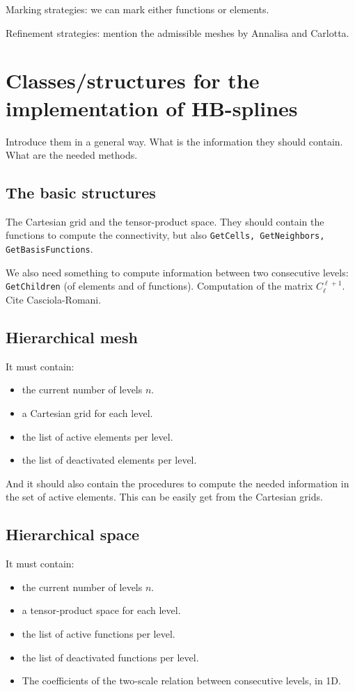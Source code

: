 \documentclass[a4paper]{siamltex1213}
\begin{document}
Marking strategies: we can mark either functions or elements.

Refinement strategies: mention the admissible meshes by Annalisa and Carlotta.


\section{Classes/structures for the implementation of HB-splines}
Introduce them in a general way. What is the information they should contain. What are the needed methods.

\subsection{The basic structures}
The Cartesian grid and the tensor-product space. They should contain the functions to compute the connectivity, but also \texttt{GetCells, GetNeighbors, GetBasisFunctions}. 

We also need something to compute information between two consecutive levels: \texttt{GetChildren} (of elements and of functions). Computation of the matrix $C_\ell^{\ell+1}$. Cite Casciola-Romani.
\subsection{Hierarchical mesh}
It must contain: 
\begin{itemize}
\item the current number of levels $n$.
\item a Cartesian grid for each level. 
\item the list of active elements per level.
\item the list of deactivated elements per level.
\end{itemize}
And it should also contain the procedures to compute the needed information in the set of active elements. This can be easily get from the Cartesian grids.

\subsection{Hierarchical space}
It must contain: 
\begin{itemize}
\item the current number of levels $n$.
\item a tensor-product space for each level. 
\item the list of active functions per level.
\item the list of deactivated functions per level.
\item The coefficients of the two-scale relation between consecutive levels, in 1D.
\end{itemize}
\end{document}
